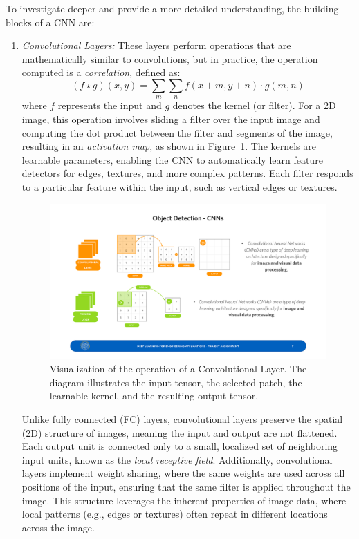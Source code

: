 To investigate deeper and provide a more detailed understanding, the building blocks of a CNN are:
\begin{enumerate}
    \item \textit{Convolutional Layers:} These layers perform operations that are mathematically similar to convolutions, but in practice, the operation computed is a \textit{correlation}, defined as:
    \begin{equation}
        (f \star g)(x, y) = \sum_{m}\sum_{n}f(x + m, y + n) \cdot g(m, n)
    \end{equation}
    where \( f \) represents the input and \( g \) denotes the kernel (or filter). For a 2D image, this operation involves sliding a filter over the input image and computing the dot product between the filter and segments of the image, resulting in an \textit{activation map}, as shown in Figure~\ref{fig:cnn-layer}. The kernels are learnable parameters, enabling the CNN to automatically learn feature detectors for edges, textures, and more complex patterns. Each filter responds to a particular feature within the input, such as vertical edges or textures.
    
    \begin{minipage}{\linewidth}
    \begin{figure}[H]
        \includegraphics[width=1\linewidth]{LateX//figs/CCN_layer.pdf}
        \caption{Visualization of the operation of a Convolutional Layer. The diagram illustrates the input tensor, the selected patch, the learnable kernel, and the resulting output tensor.}
        \label{fig:cnn-layer}
    \end{figure}
    \end{minipage}
    \vspace{0.25 cm}
    
    Unlike fully connected (FC) layers, convolutional layers preserve the spatial (2D) structure of images, meaning the input and output are not flattened. Each output unit is connected only to a small, localized set of neighboring input units, known as the \textit{local receptive field}. Additionally, convolutional layers implement weight sharing, where the same weights are used across all positions of the input, ensuring that the same filter is applied throughout the image. This structure leverages the inherent properties of image data, where local patterns (e.g., edges or textures) often repeat in different locations across the image.


\end{enumerate}
